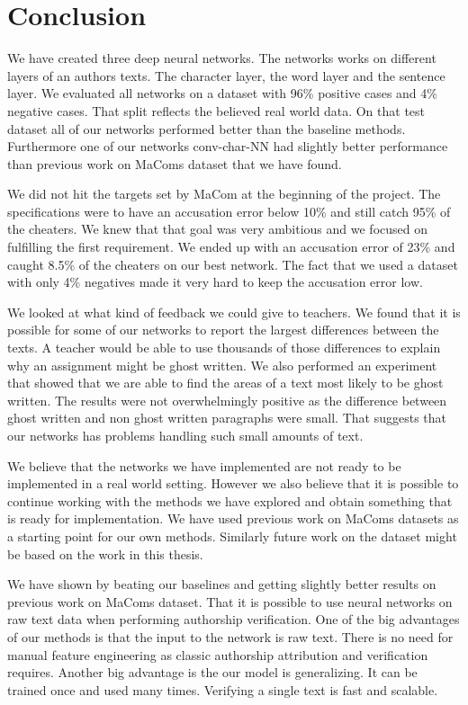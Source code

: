 \section{Conclusion} \label{sec:conclusion}

We have created three deep neural networks. The networks works on different
layers of an authors texts. The character layer, the word layer and the sentence
layer. We evaluated all networks on a dataset with 96\% positive cases and
4\% negative cases. That split reflects the believed real world data. On
that test dataset all of our networks performed better than the baseline
methods. Furthermore one of our networks \gls{conv-char-NN} had slightly better
performance than previous work on MaComs dataset that we have found.

We did not hit the targets set by MaCom at the beginning of the project. The
specifications were to have an accusation error below 10\% and still catch 95\%
of the cheaters. We knew that that goal was very ambitious and we focused on
fulfilling the first requirement. We ended up with an accusation error of 23\%
and caught 8.5\% of the cheaters on our best network. The fact that we used a
dataset with only 4\% negatives made it very hard to keep the accusation error
low.

We looked at what kind of feedback we could give to teachers. We found that it
is possible for some of our networks to report the largest differences between
the texts. A teacher would be able to use thousands of those differences
to explain why an assignment might be ghost written. We also performed an
experiment that showed that we are able to find the areas of a text most likely
to be ghost written. The results were not overwhelmingly positive as the
difference between ghost written and non ghost written paragraphs were small.
That suggests that our networks has problems handling such small amounts of
text.

We believe that the networks we have implemented are not ready to be implemented
in a real world setting. However we also believe that it is possible to continue
working with the methods we have explored and obtain something that is ready for
implementation. We have used previous work on MaComs datasets as a starting
point for our own methods. Similarly future work on the dataset might be based
on the work in this thesis.

We have shown by beating our baselines and getting slightly better results on
previous work on MaComs dataset. That it is possible to use neural networks
on raw text data when performing authorship verification. One of the big
advantages of our methods is that the input to the network is raw text. There
is no need for manual feature engineering as classic authorship attribution and
verification requires. Another big advantage is the our model is generalizing.
It can be trained once and used many times. Verifying a single text is fast and
scalable.
